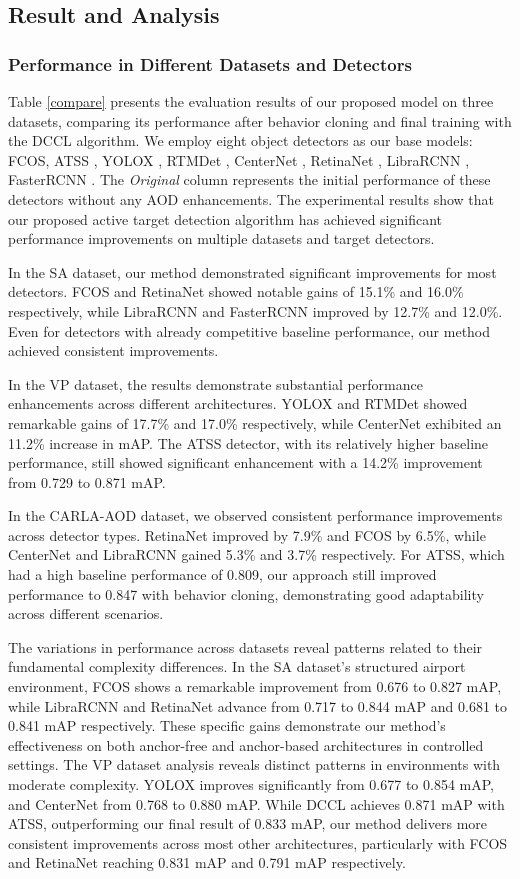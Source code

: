 \documentclass[lettersize,journal]{IEEEtran}
\begin{document}
\subsection{Result and Analysis}
\subsubsection{Performance in Different Datasets and Detectors}
Table \ref{compare} presents the evaluation results of our proposed model on three datasets, comparing its performance after behavior cloning and final training with the DCCL algorithm. We employ eight object detectors as our base models: FCOS, ATSS \cite{bridging2020}, YOLOX \cite{yolox2021}, RTMDet \cite{rtmdet2022}, CenterNet \cite{objects2019}, RetinaNet \cite{focal2017}, LibraRCNN \cite{libra2019}, FasterRCNN \cite{faster2015a}. The \textit{Original} column represents the initial performance of these detectors without any AOD enhancements.
The experimental results show that our proposed active target detection algorithm has achieved significant performance improvements on multiple datasets and target detectors.

In the SA dataset, our method demonstrated significant improvements for most detectors. FCOS and RetinaNet showed notable gains of 15.1\% and 16.0\% respectively, while LibraRCNN and FasterRCNN improved by 12.7\% and 12.0\%. Even for detectors with already competitive baseline performance, our method achieved consistent improvements.

In the VP dataset, the results demonstrate substantial performance enhancements across different architectures. YOLOX and RTMDet showed remarkable gains of 17.7\% and 17.0\% respectively, while CenterNet exhibited an 11.2\% increase in mAP. The ATSS detector, with its relatively higher baseline performance, still showed significant enhancement with a 14.2\% improvement from 0.729 to 0.871 mAP.

In the CARLA-AOD dataset, we observed consistent performance improvements across detector types. RetinaNet improved by 7.9\% and FCOS by 6.5\%, while CenterNet and LibraRCNN gained 5.3\% and 3.7\% respectively. For ATSS, which had a high baseline performance of 0.809, our approach still improved performance to 0.847 with behavior cloning, demonstrating good adaptability across different scenarios.


The variations in performance across datasets reveal patterns related to their fundamental complexity differences. In the SA dataset's structured airport environment, FCOS shows a remarkable improvement from 0.676 to 0.827 mAP, while LibraRCNN and RetinaNet advance from 0.717 to 0.844 mAP and 0.681 to 0.841 mAP respectively. These specific gains demonstrate our method's effectiveness on both anchor-free and anchor-based architectures in controlled settings.
The VP dataset analysis reveals distinct patterns in environments with moderate complexity. YOLOX improves significantly from 0.677 to 0.854 mAP, and CenterNet from 0.768 to 0.880 mAP. While DCCL achieves 0.871 mAP with ATSS, outperforming our final result of 0.833 mAP, our method delivers more consistent improvements across most other architectures, particularly with FCOS and RetinaNet reaching 0.831 mAP and 0.791 mAP respectively.
\end{document}
